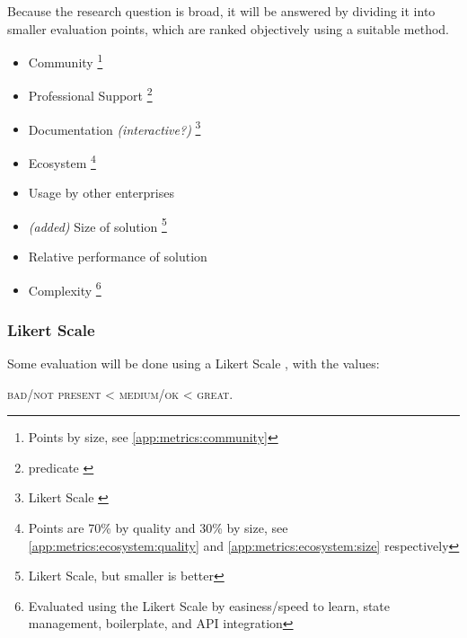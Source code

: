 Because the research question is broad, it will be answered by dividing it into smaller evaluation points, which are ranked objectively using a suitable method.

\begin{itemize}
    \item Community \footnote{Points by size, see \ref{app:metrics:community}}
    \item Professional Support \footnote{\Gls{predicate} \label{fn:predicate}}
    \item Documentation \textit{(interactive?)} \footnote{Likert Scale \label{fn:likert_scale}}
    \item Ecosystem \footnote{Points are 70\% by quality and 30\% by size, see \ref{app:metrics:ecosystem:quality} and \ref{app:metrics:ecosystem:size} respectively}
    \item Usage by other enterprises 
    \item \textit{(added)} Size of solution \footnote{Likert Scale, but smaller is better}
    \item Relative performance of solution 
    \item Complexity \footnote{Evaluated using the Likert Scale by easiness/speed to learn, state management, boilerplate, and API integration}
\end{itemize}

\subsubsection{Likert Scale}

Some evaluation will be done using a Likert Scale \cite{enwiki:likert_scale}, with the values:

\begin{center}
    \textsc{bad/not present} < \textsc{medium/ok} < \textsc{great}.
\end{center}
